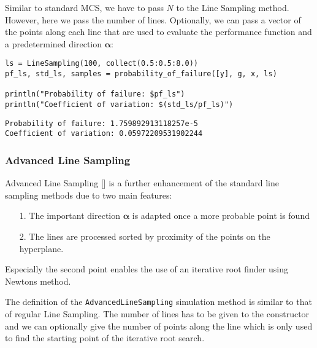 Similar to standard MCS, we have to pass \(N\) to the Line Sampling method. However, here we pass the number of lines. Optionally, we can pass a vector of the points along each line that are used to evaluate the performance function and a predetermined direction \(\boldsymbol{\alpha}\):




\begin{verbatim}
ls = LineSampling(100, collect(0.5:0.5:8.0))
pf_ls, std_ls, samples = probability_of_failure([y], g, x, ls)

println("Probability of failure: $pf_ls")
println("Coefficient of variation: $(std_ls/pf_ls)")
\end{verbatim}


\begin{verbatim}
Probability of failure: 1.759892913118257e-5
Coefficient of variation: 0.05972209531902244
\end{verbatim}



\subsubsection{Advanced Line Sampling}



\label{17490737439385466936}{}


Advanced Line Sampling [] is a further enhancement of the standard line sampling methods due to two main features:



\begin{itemize}
\item[1. ] The important direction \(\boldsymbol{\alpha}\) is adapted once a more probable point is found


\item[2. ] The lines are processed sorted by proximity of the points on the hyperplane.

\end{itemize}


Especially the second point enables the use of an iterative root finder using Newton{\textquotesingle}s method.



The definition of the \texttt{AdvancedLineSampling} simulation method is similar to that of regular Line Sampling. The number of lines has to be given to the constructor and we can optionally give the number of points along the line which is only used to find the starting point of the iterative root search.




